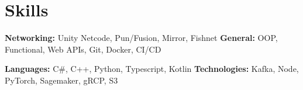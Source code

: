 
\vspace{5 pt - 0.5 cm}
\section{Skills}
\vspace{5 pt - 1 cm}
\begin{multicols}{2}
    \textbf{Networking:} Unity Netcode, Pun/Fusion, Mirror, Fishnet
    \textbf{General:} OOP, Functional, Web APIs, Git, Docker, CI/CD 

    \textbf{Languages:} C\#, C++, Python, Typescript, Kotlin
    \textbf{Technologies:} Kafka, Node, PyTorch, Sagemaker, gRCP, S3
\end{multicols}



